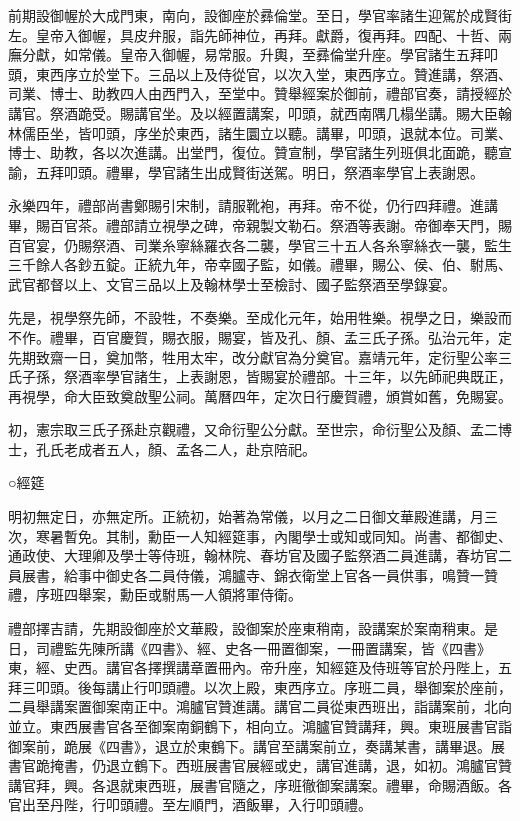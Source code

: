 前期設御幄於大成門東，南向，設御座於彞倫堂。至日，學官率諸生迎駕於成賢街左。皇帝入御幄，具皮弁服，詣先師神位，再拜。獻爵，復再拜。四配、十哲、兩廡分獻，如常儀。皇帝入御幄，易常服。升輿，至彞倫堂升座。學官諸生五拜叩頭，東西序立於堂下。三品以上及侍從官，以次入堂，東西序立。贊進講，祭酒、司業、博士、助教四人由西門入，至堂中。贊舉經案於御前，禮部官奏，請授經於講官。祭酒跪受。賜講官坐。及以經置講案，叩頭，就西南隅几榻坐講。賜大臣翰林儒臣坐，皆叩頭，序坐於東西，諸生圜立以聽。講畢，叩頭，退就本位。司業、博士、助教，各以次進講。出堂門，復位。贊宣制，學官諸生列班俱北面跪，聽宣諭，五拜叩頭。禮畢，學官諸生出成賢街送駕。明日，祭酒率學官上表謝恩。

永樂四年，禮部尚書鄭賜引宋制，請服靴袍，再拜。帝不從，仍行四拜禮。進講畢，賜百官茶。禮部請立視學之碑，帝親製文勒石。祭酒等表謝。帝御奉天門，賜百官宴，仍賜祭酒、司業糸寧絲羅衣各二襲，學官三十五人各糸寧絲衣一襲，監生三千餘人各鈔五錠。正統九年，帝幸國子監，如儀。禮畢，賜公、侯、伯、駙馬、武官都督以上、文官三品以上及翰林學士至檢討、國子監祭酒至學錄宴。

先是，視學祭先師，不設牲，不奏樂。至成化元年，始用牲樂。視學之日，樂設而不作。禮畢，百官慶賀，賜衣服，賜宴，皆及孔、顏、孟三氏子孫。弘治元年，定先期致齋一日，奠加幣，牲用太牢，改分獻官為分奠官。嘉靖元年，定衍聖公率三氏子孫，祭酒率學官諸生，上表謝恩，皆賜宴於禮部。十三年，以先師祀典既正，再視學，命大臣致奠啟聖公祠。萬曆四年，定次日行慶賀禮，頒賞如舊，免賜宴。

初，憲宗取三氏子孫赴京觀禮，又命衍聖公分獻。至世宗，命衍聖公及顏、孟二博士，孔氏老成者五人，顏、孟各二人，赴京陪祀。

○經筵

明初無定日，亦無定所。正統初，始著為常儀，以月之二日御文華殿進講，月三次，寒暑暫免。其制，勳臣一人知經筵事，內閣學士或知或同知。尚書、都御史、通政使、大理卿及學士等侍班，翰林院、春坊官及國子監祭酒二員進講，春坊官二員展書，給事中御史各二員侍儀，鴻臚寺、錦衣衛堂上官各一員供事，鳴贊一贊禮，序班四舉案，勳臣或駙馬一人領將軍侍衛。

禮部擇吉請，先期設御座於文華殿，設御案於座東稍南，設講案於案南稍東。是日，司禮監先陳所講《四書》、經、史各一冊置御案，一冊置講案，皆《四書》東，經、史西。講官各擇撰講章置冊內。帝升座，知經筵及侍班等官於丹陛上，五拜三叩頭。後每講止行叩頭禮。以次上殿，東西序立。序班二員，舉御案於座前，二員舉講案置御案南正中。鴻臚官贊進講。講官二員從東西班出，詣講案前，北向並立。東西展書官各至御案南銅鶴下，相向立。鴻臚官贊講拜，興。東班展書官詣御案前，跪展《四書》，退立於東鶴下。講官至講案前立，奏講某書，講畢退。展書官跪掩書，仍退立鶴下。西班展書官展經或史，講官進講，退，如初。鴻臚官贊講官拜，興。各退就東西班，展書官隨之，序班徹御案講案。禮畢，命賜酒飯。各官出至丹陛，行叩頭禮。至左順門，酒飯畢，入行叩頭禮。

